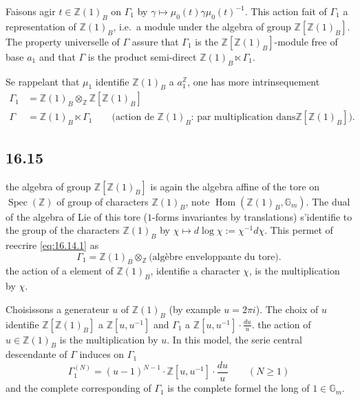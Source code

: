 \documentclass[12pt,a4paper]{article}
\theoremstyle{plain}
\theoremstyle{definition}
\theoremstyle{remark}
\DeclareMathOperator{\Spec}{Spec}
\DeclareMathOperator{\Hom}{Hom}
\newcommand{\Betti}{B}
\newcommand{\Gm}{\mathbb{G}_m}
\newcommand{\ZZ}{\mathbb{Z}}
\begin{document}
Faisons agir $t \in \ZZ(1)_\Betti$ on $\Gamma_1$ by
$\gamma \mapsto \mu_0(t)\gamma\mu_0(t)^{-1}$. This action fait of $\Gamma_1$
a representation of $\ZZ(1)_\Betti$, i.e.\ a module under the algebra of
group $\ZZ[\ZZ(1)_\Betti]$. The property universelle of $\Gamma$ assure
that $\Gamma_1$ is the $\ZZ[\ZZ(1)_\Betti]$-module free of base $a_1$ and that
$\Gamma$ is the product semi-direct $\ZZ(1)_\Betti \ltimes \Gamma_1$.

Se rappelant that $\mu_1$ identifie $\ZZ(1)_\Betti$ a $a_1^\ZZ$, one has more
intrinsequement
\begin{align}
\Gamma_1 &= \ZZ(1)_\Betti \otimes_\ZZ \ZZ[\ZZ(1)_\Betti] \label{eq:16.14.1} \\
\Gamma &= \ZZ(1)_\Betti \ltimes \Gamma_1 \qquad
\text{(action de $\ZZ(1)_\Betti$: par multiplication dans
$\ZZ[\ZZ(1)_\Betti]$).} \label{eq:16.14.2}
\end{align}

\subsection*{16.15}

the algebra of group $\ZZ[\ZZ(1)_\Betti]$ is again the algebra affine of the
tore on $\Spec(\ZZ)$ of group of characters $\ZZ(1)_\Betti$, note
$\Hom(\ZZ(1)_\Betti, \Gm)$. The dual of the algebra of Lie of this tore
($1$-forms invariantes by translations) s'identifie to the group of the
characters $\ZZ(1)_\Betti$ by
$\chi \mapsto d\log\chi := \chi^{-1}d\chi$. This permet of reecrire
\eqref{eq:16.14.1} as
\begin{equation}\label{eq:16.15.1}
\Gamma_1 = \ZZ(1)_\Betti \otimes_\ZZ \text{(alg\`ebre enveloppante du
tore).}
\end{equation}
the action of a element of $\ZZ(1)_\Betti$, identifie a character
$\chi$, is the multiplication by $\chi$.

Choisissons a generateur $u$ of $\ZZ(1)_\Betti$ (by example
$u = 2\pi i$). The choix of $u$ identifie $\ZZ[\ZZ(1)_\Betti]$ a
$\ZZ[u,u^{-1}]$ and $\Gamma_1$ a
$\ZZ[u,u^{-1}] \cdot \frac{du}{u}$. the action of $u \in \ZZ(1)_\Betti$ is the
multiplication by $u$. In this model, the serie central descendante
of $\Gamma$ induces on $\Gamma_1$
\begin{equation}\label{eq:16.15.2}
\Gamma_1^{(N)} = (u-1)^{N-1} \cdot \ZZ[u,u^{-1}] \cdot \frac{du}{u}
\qquad (N \geq 1)
\end{equation}
and the complete corresponding of $\Gamma_1$ is the complete formel the
long of $1 \in \Gm$.
\end{document}
